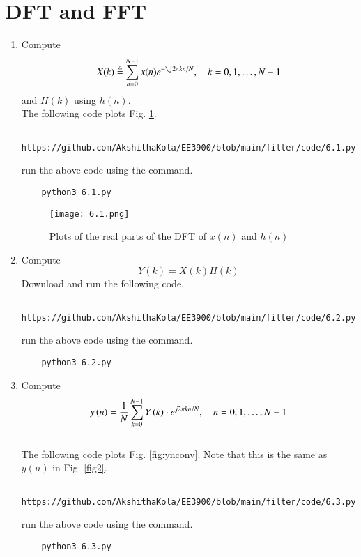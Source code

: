 \documentclass[journal,12pt,twocolumn]{IEEEtran}
\renewcommand\thesection{\arabic{section}}
\begin{document}
\section{DFT and FFT}
\begin{enumerate}[label=\thesection.\arabic*
,ref=\thesection.\theenumi]
\item
Compute
\begin{equation}
X(k) \define \sum _{n=0}^{N-1}x(n) e^{-\j2\pi kn/N}, \quad k = 0,1,\dots, N-1
\end{equation}
and $H(k)$ using $h(n)$.\\
\solution The following code plots Fig. \ref{fig:6.1}.
%
\begin{lstlisting}
	https://github.com/AkshithaKola/EE3900/blob/main/filter/code/6.1.py
\end{lstlisting}
run the above code using the command.
\begin{lstlisting}
	python3 6.1.py
\end{lstlisting}
\begin{figure}[!ht]
\centering
\texttt{[image: 6.1.png]}
\caption{Plots of the real parts of the DFT of $x(n)$ and $h(n)$}
\label{fig:6.1}
\end{figure}
\item Compute 
\begin{equation}\label{6.2}
Y(k) = X(k)H(k)
\end{equation}
\solution Download and run the following code.
%
\begin{lstlisting}
	https://github.com/AkshithaKola/EE3900/blob/main/filter/code/6.2.py
\end{lstlisting}
run the above code using the command.
\begin{lstlisting}
	python3 6.2.py
\end{lstlisting}
\item Compute
\begin{equation} \label{6.3}
 y\left(n\right)={\frac {1}{N}}\sum _{k=0}^{N-1}Y\left(k\right)\cdot e^{j 2\pi kn/N},\quad n = 0,1,\dots, N-1
\end{equation}
\\
\solution The following code plots Fig. \ref{fig:ynconv}. Note that this is the same as 
$y(n)$ in  Fig. 
\ref{fig2}. 
%
\begin{lstlisting}
	https://github.com/AkshithaKola/EE3900/blob/main/filter/code/6.3.py
\end{lstlisting}
run the above code using the command.
\begin{lstlisting}
	python3 6.3.py

\end{lstlisting}
\end{enumerate}
\end{document}

